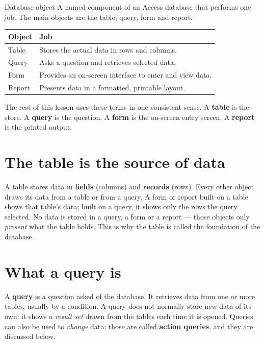 \begin{definitionbox}{Database object}
A named component of an Access database that performs one job. The main
objects are the table, query, form and report.
\end{definitionbox}

\begin{center}
\begin{tabular}{p{}p{}}
\toprule
\textbf{Object} & \textbf{Job} \\
\midrule
Table & Stores the actual data in rows and columns. \\
Query & Asks a question and retrieves selected data. \\
Form & Provides an on-screen interface to enter and view data. \\
Report & Presents data in a formatted, printable layout. \\
\bottomrule
\end{tabular}
\end{center}

The rest of this lesson uses these terms in one consistent sense. A
\textbf{table} is the store. A \textbf{query} is the question. A
\textbf{form} is the on-screen entry screen. A \textbf{report} is the printed
output.

\section{The table is the source of data}
A table stores data in \textbf{fields} (columns) and \textbf{records}
(rows). Every other object draws its data from a table or from a query. A
form or report built on a table shows that table's data; built on a query,
it shows only the rows the query selected. No data is stored in a query, a
form or a report --- those objects only \emph{present} what the table holds.
This is why the table is called the foundation of the database.

\section{What a query is}
A \textbf{query} is a question asked of the database. It retrieves data from
one or more tables, usually by a condition. A query does not normally store
new data of its own; it shows a \emph{result set} drawn from the tables each
time it is opened. Queries can also be used to \emph{change} data; those are
called \textbf{action queries}, and they are discussed below.

